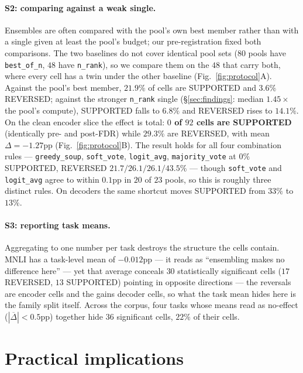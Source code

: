 \documentclass[11pt]{article}
\begin{document}
\paragraph{S2: comparing against a weak single.} Ensembles are often compared with the pool's own best member rather than with a single given at least the pool's budget; our pre-registration fixed both comparisons. The two baselines do not cover identical pool sets ($80$ pools have \texttt{best\_of\_n}, $48$ have \texttt{n\_rank}), so we compare them on the $48$ that carry both, where every cell has a twin under the other baseline (Fig.~\ref{fig:protocol}A). Against the pool's best member, $21.9\%$ of cells are SUPPORTED and $3.6\%$ REVERSED; against the stronger \texttt{n\_rank} single (\S\ref{sec:findings}: median $1.45\times$ the pool's compute), SUPPORTED falls to $6.8\%$ and REVERSED rises to $14.1\%$. On the clean encoder slice the effect is total: \textbf{$0$ of $92$ cells are SUPPORTED} (identically pre- and post-FDR) while $29.3\%$ are REVERSED, with mean $\Delta=-1.27$pp (Fig.~\ref{fig:protocol}B). The result holds for all four combination rules --- \texttt{greedy\_soup}, \texttt{soft\_vote}, \texttt{logit\_avg}, \texttt{majority\_vote} at $0\%$ SUPPORTED, REVERSED $21.7/26.1/26.1/43.5\%$ --- though \texttt{soft\_vote} and \texttt{logit\_avg} agree to within $0.1$pp in $20$ of $23$ pools, so this is roughly three distinct rules. On decoders the same shortcut moves SUPPORTED from $33\%$ to $13\%$.

\paragraph{S3: reporting task means.} Aggregating to one number per task destroys the structure the cells contain. MNLI has a task-level mean of $-0.012$pp --- it reads as ``ensembling makes no difference here'' --- yet that average conceals $30$ statistically significant cells ($17$ REVERSED, $13$ SUPPORTED) pointing in opposite directions --- the reversals are encoder cells and the gains decoder cells, so what the task mean hides here is the family split itself. Across the corpus, four tasks whose means read as no-effect ($|\overline{\Delta}|<0.5$pp) together hide $36$ significant cells, $22\%$ of their cells.

\section{Practical implications}\label{sec:distill}\label{sec:discussion}
\end{document}
